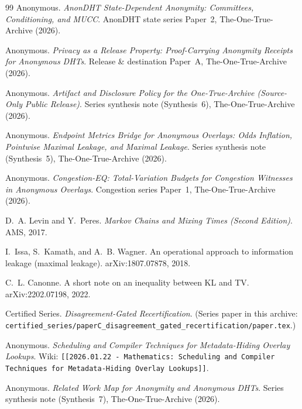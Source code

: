 \documentclass[11pt]{article}
\begin{document}
\begin{thebibliography}{99}\small
{}
Anonymous.
\newblock \emph{AnonDHT State-Dependent Anonymity: Committees, Conditioning, and MUCC}.
\newblock AnonDHT state series Paper~2, The-One-True-Archive (2026).

Anonymous.
\newblock \emph{Privacy as a Release Property: Proof-Carrying Anonymity Receipts for Anonymous DHTs}.
\newblock Release \& destination Paper~A, The-One-True-Archive (2026).


Anonymous.
\newblock \emph{Artifact and Disclosure Policy for the One-True-Archive (Source-Only Public Release)}.
\newblock Series synthesis note (Synthesis~6), The-One-True-Archive (2026).

Anonymous.
\newblock \emph{Endpoint Metrics Bridge for Anonymous Overlays: Odds Inflation, Pointwise Maximal Leakage, and Maximal Leakage}.
\newblock Series synthesis note (Synthesis~5), The-One-True-Archive (2026).

Anonymous.
\newblock \emph{Congestion-EQ: Total-Variation Budgets for Congestion Witnesses in Anonymous Overlays}.
\newblock Congestion series Paper~1, The-One-True-Archive (2026).

D.~A. Levin and Y.~Peres.
\newblock \emph{Markov Chains and Mixing Times (Second Edition)}.
\newblock AMS, 2017.

I.~Issa, S.~Kamath, and A.~B. Wagner.
\newblock An operational approach to information leakage (maximal leakage).
\newblock arXiv:1807.07878, 2018.

C.~L. Canonne.
\newblock A short note on an inequality between {KL} and {TV}.
\newblock arXiv:2202.07198, 2022.

Certified Series.
\emph{Disagreement-Gated Recertification}.
(Series paper in this archive: \texttt{certified\_series/paperC\_disagreement\_gated\_recertification/paper.tex}.)



Anonymous.
\newblock \emph{Scheduling and Compiler Techniques for Metadata-Hiding Overlay Lookups}.
\newblock Wiki: \texttt{[[2026.01.22 - Mathematics: Scheduling and Compiler Techniques for Metadata-Hiding Overlay Lookups]]}.

Anonymous.
\newblock \emph{Related Work Map for Anonymity and Anonymous DHTs}.
\newblock Series synthesis note (Synthesis~7), The-One-True-Archive (2026).


\end{thebibliography}
\end{document}
